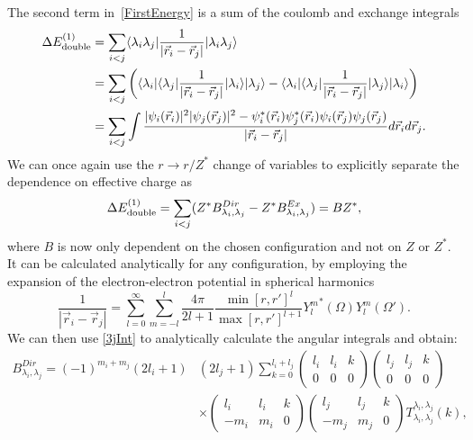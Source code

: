 The second term in~\eqref{FirstEnergy} is a sum of the coulomb and exchange integrals
\begin{align} \label{FirstDouble}
\Delta E^{(1)}_{\rm{double}} &= \sum_{i<j} \langle \lambda_i \lambda_j|\frac{1}{|\vec{r}_i - \vec{r}_j|}|\lambda_i \lambda_j \rangle \nonumber\\
&= \sum_{i<j} \left(\langle \lambda_i| \langle \lambda_j|\frac{1}{|\vec{r}_i - \vec{r}_j|}|\lambda_i \rangle | \lambda_j \rangle  - \langle \lambda_i| \langle \lambda_j|\frac{1}{|\vec{r}_i - \vec{r}_j|}|\lambda_j \rangle | \lambda_i \rangle \right) \nonumber\\
 &= \sum_{i<j} \int \frac{|\psi_i(\vec{r}_i)|^2
	|\psi_j(\vec{r}_j)|^2 -
	\psi_i^*(\vec{r}_i)\psi_j^*(\vec{r}_i)\psi_i(\vec{r}_j)\psi_j(\vec{r}_j)}
{|\vec{r}_i - \vec{r}_j|} d \vec{r}_i d \vec{r}_j.
\end{align}
We can once again use the $r \rightarrow r/Z^*$ change of variables to explicitly separate the dependence on effective charge as
\begin{equation} \label{SchrB}
    \Delta E^{(1)}_{\rm{double}} = \sum_{i<j} (Z^* B^{Dir}_{\lambda_i,\lambda_j} - Z^* B^{Ex}_{\lambda_i,\lambda_j}) = B Z^*,
\end{equation}
where $B$ is now only dependent on the chosen configuration and not on $Z$ or $Z^*$. It can be calculated analytically
for any configuration, by employing the expansion of the electron-electron potential in spherical harmonics
\begin{equation} 
\frac{1}{|\vec{r}_i - \vec{r}_j|} = \sum_{l=0}^\infty \sum_{m=-l}^{l} \frac{4\pi}{2l+1}
\frac{\min[r,r']^l}{\max[r,r']^{l+1}} {Y_l^m}^*(\Omega)
Y_l^m(\Omega').
\end{equation}
We can then use \eqref{3jInt} to analytically calculate the angular integrals and obtain:
\begin{align}
    B^{Dir}_{\lambda_i,\lambda_j} = (-1)^{m_i+m_j}(2l_i+1)&(2l_j+1)\sum_{k=0}^{l_i+l_j}
    \begin{pmatrix} l_i & l_i & k \\ 0 & 0 & 0\end{pmatrix}
    \begin{pmatrix} l_j & l_j & k \\ 0 & 0 & 0 \end{pmatrix} \nonumber
\\& \times
    \begin{pmatrix} l_i & l_i & k \\ -m_i & m_i & 0 \end{pmatrix}
	\begin{pmatrix} l_j & l_j & k \\ -m_j & m_j & 0 \end{pmatrix} 
T^{\lambda_i,\lambda_j}_{\lambda_i,\lambda_j}(k),
\end{align}
